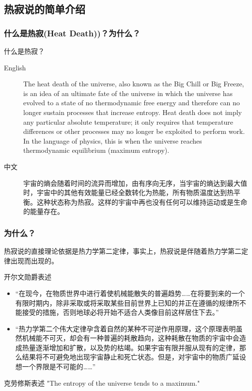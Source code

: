 \documentclass{if-beamer}
\begin{document}
\subsection{热寂说的简单介绍}
\begin{frame}
    \frametitle{什么是热寂(Heat Death))？为什么？}
    \begin{block}{什么是热寂？}
        \begin{description}
            \item[English]    The heat death of the universe, also known as the Big Chill or Big Freeze, is an idea of an ultimate fate of the universe in which the universe has evolved to a state of no thermodynamic free energy and therefore can no longer sustain processes that increase entropy. Heat death does not imply any particular absolute temperature; it only requires that temperature differences or other processes may no longer be exploited to perform work. In the language of physics, this is when the universe reaches thermodynamic equilibrium (maximum entropy).
            \item[中文] 宇宙的熵会随着时间的流异而增加，由有序向无序，当宇宙的熵达到最大值时，宇宙中的其他有效能量已经全数转化为热能，所有物质温度达到热平衡。这种状态称为热寂。这样的宇宙中再也没有任何可以维持运动或是生命的能量存在。 

        \end{description}
    \end{block}

\end{frame}
    

\begin{frame}
    \frametitle{为什么？}
        热寂说的直接理论依据是热力学第二定律，事实上，热寂说是伴随着热力学第二定律出现而出现的。
        \begin{block}{开尔文勋爵表述}
            \begin{itemize}
                \item “在现今，在物质世界中进行着使机械能散失的普遍趋势……在将要到来的一个有限时期内，除非采取或将采取某些目前世界上已知的并正在遵循的规律所不能接受的措施，否则地球必将开始不适合人类像目前这样居住下去。”
                \item “热力学第二个伟大定律孕含着自然的某种不可逆作用原理，这个原理表明虽然机械能不可灭，却会有一种普遍的耗散趋向，这种耗散在物质的宇宙中会造成热量逐渐增加和扩散，以及势的枯竭。如果宇宙有限并服从现有的定律，那么结果将不可避免地出现宇宙静止和死亡状态。但是，对宇宙中的物质广延设想一个界限是不可能的……”
            \end{itemize}
        
            
        \end{block}
        \begin{block}{克劳修斯表述}
            "The entropy of the universe tends to a maximum."
        \end{block}
    

\end{frame}
\end{document}
